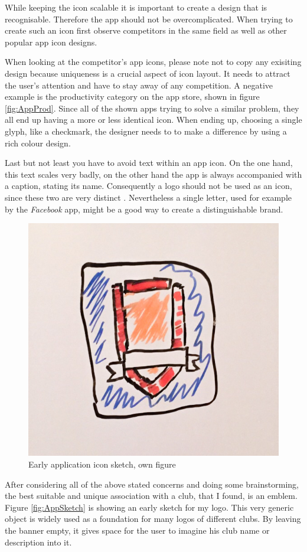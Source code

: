 While keeping the icon scalable it is important to create a design that is recognisable. Therefore the app should not be overcomplicated. When trying to create such an icon first observe competitors in the same field as well as other popular app icon designs. \cite{Flarup:2015aa}

When looking at the competitor's app icons, please note not to copy any exisiting design because uniqueness is a crucial aspect of icon layout. It needs to attract the user's attention and have to stay away of any competition. A negative example is the productivity category on the app store, shown in figure \vref{fig:AppProd}. Since all of the shown apps trying to solve a similar problem, they all end up having a more or less identical icon. When ending up, choosing a single glyph, like a checkmark, the designer needs to to make a difference by using a rich colour design. \cite{Flarup:2015aa}

Last but not least you have to avoid text within an app icon. On the one hand, this text scales very badly, on the other hand the app is always accompanied with a caption, stating its name. Consequently a logo should not be used as an icon, since these two are very distinct \cite{Flarup:2015ab}. Nevertheless a single letter, used for example by the \emph{Facebook} app, might be a good way to create a distinguishable brand.

\begin{figure}[h]
  	\centering
  	\includegraphics[width=0.5\linewidth]{./images/app-sketch.jpg}
  	\caption{Early application icon sketch, own figure}
	\label{fig:AppSketch}
\end{figure}

After considering all of the above stated concerns and doing some brainstorming, the best suitable and unique association with a club, that I found, is an emblem. Figure \vref{fig:AppSketch} is showing an early sketch for my logo. This very generic object is widely used as a foundation for many logos of different clubs. By leaving the banner empty, it gives space for the user to imagine his club name or description into it. 

